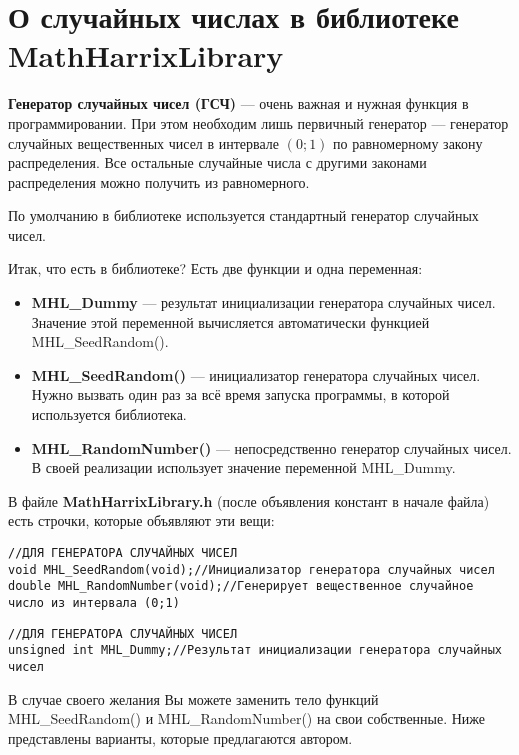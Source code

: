\newpage
\section{О случайных числах в библиотеке MathHarrixLibrary}\label{section_random}

\textbf{Генератор случайных чисел (ГСЧ)} --- очень важная и нужная функция в программировании. При этом необходим лишь первичный генератор --- генератор случайных вещественных чисел в интервале $\left( 0; 1\right)$ по равномерному закону распределения. Все остальные случайные числа с другими законами распределения можно получить из равномерного.

По умолчанию в библиотеке используется стандартный генератор случайных чисел.


Итак, что есть в библиотеке? Есть две функции и одна переменная:
\begin{itemize}
\item \textbf{MHL\_Dummy} --- результат инициализации генератора случайных чисел. Значение этой переменной вычисляется автоматически функцией MHL\_SeedRandom().
\item \textbf{MHL\_SeedRandom()} --- инициализатор генератора случайных чисел. Нужно вызвать один раз за всё время запуска программы, в которой используется библиотека.
\item \textbf{MHL\_RandomNumber()} --- непосредственно генератор случайных чисел. В своей реализации использует значение переменной MHL\_Dummy.
\end{itemize}

В файле \textbf{MathHarrixLibrary.h} (после объявления констант в начале файла) есть строчки, которые объявляют эти вещи:
\begin{lstlisting}[label=random_h,caption=Объявление функций в MathHarrixLibrary.h]
//ДЛЯ ГЕНЕРАТОРА СЛУЧАЙНЫХ ЧИСЕЛ
void MHL_SeedRandom(void);//Инициализатор генератора случайных чисел
double MHL_RandomNumber(void);//Генерирует вещественное случайное число из интервала (0;1)
\end{lstlisting}

\begin{lstlisting}[label=random_h,caption=Объявление переменной в MathHarrixLibrary.cpp]
//ДЛЯ ГЕНЕРАТОРА СЛУЧАЙНЫХ ЧИСЕЛ
unsigned int MHL_Dummy;//Результат инициализации генератора случайных чисел
\end{lstlisting}

В случае своего желания Вы можете заменить тело функций MHL\_SeedRandom() и MHL\_RandomNumber() на свои собственные. Ниже представлены варианты, которые предлагаются автором.

